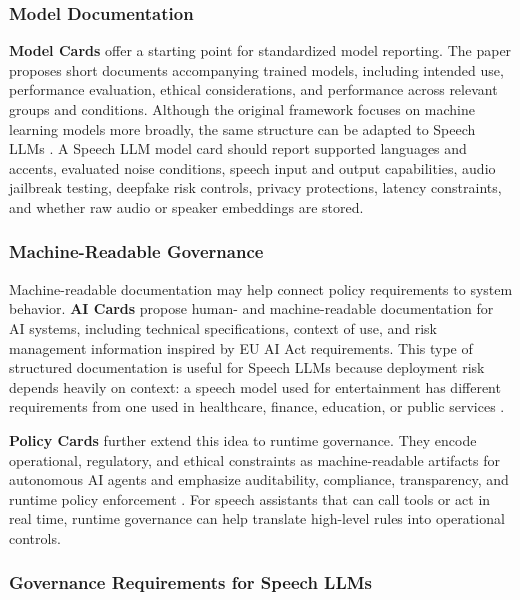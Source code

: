 \subsubsection{Model Documentation}

\textbf{Model Cards} offer a starting point for standardized model reporting. The paper proposes short documents accompanying trained models, including intended use, performance evaluation, ethical considerations, and performance across relevant groups and conditions. Although the original framework focuses on machine learning models more broadly, the same structure can be adapted to Speech LLMs \citep{mitchell2019modelcards}. A Speech LLM model card should report supported languages and accents, evaluated noise conditions, speech input and output capabilities, audio jailbreak testing, deepfake risk controls, privacy protections, latency constraints, and whether raw audio or speaker embeddings are stored.

\subsubsection{Machine-Readable Governance}

Machine-readable documentation may help connect policy requirements to system behavior. \textbf{AI Cards} propose human- and machine-readable documentation for AI systems, including technical specifications, context of use, and risk management information inspired by EU AI Act requirements. This type of structured documentation is useful for Speech LLMs because deployment risk depends heavily on context: a speech model used for entertainment has different requirements from one used in healthcare, finance, education, or public services \citep{golpayegani2024aicardsappliedframework}.

\textbf{Policy Cards} further extend this idea to runtime governance. They encode operational, regulatory, and ethical constraints as machine-readable artifacts for autonomous AI agents and emphasize auditability, compliance, transparency, and runtime policy enforcement \citep{mavracic2025policycards}. For speech assistants that can call tools or act in real time, runtime governance can help translate high-level rules into operational controls.

\subsubsection{Governance Requirements for Speech LLMs}

